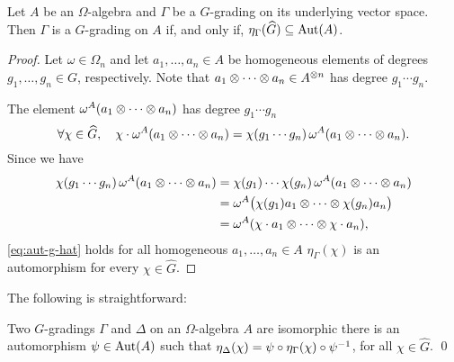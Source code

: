 
\begin{prop}\label{prop:g-hat-Aut-A}
	Let $A$ be an $\Omega$-algebra and $\Gamma$ be a $G$-grading on its underlying vector space.
	Then $\Gamma$ is a $G$-grading on $A$ 
	if, and only if, $\eta_\Gamma(\widehat G) \subseteq \operatorname{Aut}(A)$.
\end{prop}

\begin{proof}
    Let $\omega \in \Omega_n$ and let $a_1, \ldots, a_n \in A$ be homogeneous elements of degrees $g_1, \ldots, g_n \in G$, respectively. 
    Note that $a_1\otimes \cdots \otimes a_n \in A^{\otimes n}$ has degree $g_1 \cdots g_n$. 
    

    The element $\omega^A (a_1\otimes \cdots \otimes a_n)$ has degree $g_1 \cdots g_n$ \IFF 
    \[\label{eq:aut-g-hat}
        \forall \chi \in \widehat G, \quad
        \chi \cdot \omega^A (a_1\otimes \cdots \otimes a_n) 
		= \chi(g_1 \cdots g_n) \, \omega^A(a_1\otimes \cdots \otimes a_n).
    \]
	Since we have
	\begin{align*}
		\chi(g_1 \cdots g_n) \, \omega^A(a_1\otimes \cdots \otimes a_n) 
		& =\chi(g_1) \cdots \chi(g_n) \, \omega^A(a_1\otimes \cdots \otimes a_n) \\
		& = \omega^A \big(\chi(g_1)a_1\otimes \cdots \otimes \chi(g_n)a_n \big) \\
		& = \omega^A(\chi \cdot a_1 \otimes \cdots \otimes  \chi \cdot a_n),
	\end{align*}
%	
	\cref{eq:aut-g-hat} holds for all homogeneous $a_1, \ldots, a_n \in A$ \IFF $\eta_\Gamma (\chi)$ is an automorphism for every $\chi \in \widehat G$.  
\end{proof}


The following is straightforward:

\begin{prop}\label{prop:iso-g-hat-action}
    Two $G$-gradings $\Gamma$ and $\Delta$ on an $\Omega$-algebra $A$ are isomorphic \IFF there is an automorphism $\psi \in \operatorname{Aut}(A)$ such that $\eta_\Delta(\chi) = \psi \circ \eta_\Gamma(\chi) \circ \psi^{-1}$, for all $\chi \in \widehat G$. \qed
\end{prop}

